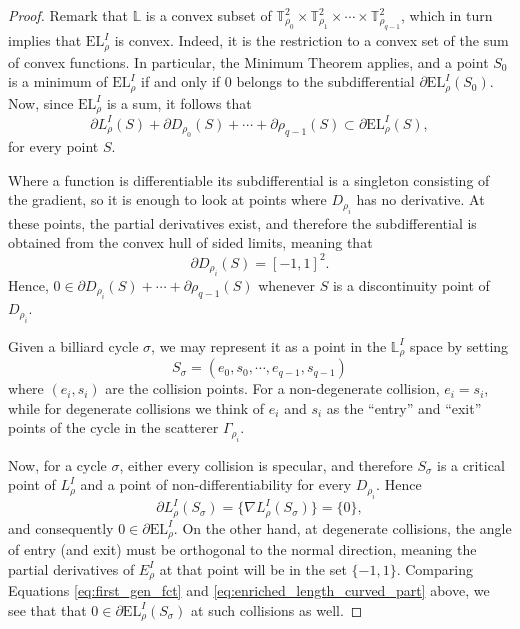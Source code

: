 \documentclass[reqno,11pt]{amsart}
\begin{document}
\begin{proof}
Remark that \( \mathbb{L} \) is a convex subset of \( \mathbb{T}_{\rho_0}^2 \times \mathbb{T}_{\rho_1}^2 \times \cdots \times \mathbb{T}_{\rho_{q-1}}^2 \), which in turn implies that \( \mathrm{EL}^I_\rho \) is convex. 
Indeed, it is the restriction to a convex set of the sum of convex functions.
In particular, the Minimum Theorem applies, and a point \( S_0 \) is a minimum of \( \mathrm{EL}^I_\rho \) if and only if \( 0 \) belongs to the subdifferential \( \partial\mathrm{EL}^I_\rho(S_0) \).
Now, since \( \mathrm{EL}^I_\rho \) is a sum, it follows that
\[
    \partial L^I_\rho(S) + \partial D_{\rho_0}(S) + \cdots + \partial {\rho_{q-1}}(S) \subset \partial\mathrm{EL}^I_\rho(S),
\]
for every point \( S \).
\par Where a function is differentiable its subdifferential is a singleton consisting of the gradient, so it is enough to look at points where \( D_{\rho_i} \) has no derivative.
At these points, the partial derivatives exist, and therefore the subdifferential is obtained from the convex hull of sided limits, meaning that
\[
    \partial D_{\rho_i} (S) = [-1, 1]^2.
\]
Hence, \( 0 \in \partial D_{\rho_i}(S) + \cdots + \partial {\rho_{q-1}}(S) \) whenever \( S \) is a discontinuity point of \( D_{\rho_i} \).
\par Given a billiard cycle \( \sigma \), we may represent it as a point in the \( \mathbb{L}^I_\rho \) space by setting
\[
    S_\sigma = (e_0, s_0, \cdots, e_{q-1}, s_{q-1})
\]
where \( (e_i, s_i) \) are the collision points. 
For a non-degenerate collision, \( e_i = s_i \), while for degenerate collisions we think of \(e_i\) and \(s_i\) as the ``entry'' and ``exit'' points of the cycle in the scatterer \( \Gamma_{\rho_i} \).
\par Now, for a cycle \(\sigma\), either every collision is specular, and therefore \( S_\sigma \) is a critical point of \( L^I_\rho \) and a point of non-differentiability for every \(D_{\rho_i}\). 
Hence
\[
    \partial L^I_\rho(S_\sigma) = \{\nabla L^I_\rho(S_\sigma)\} = \{0\},
\]
and consequently \( 0 \in \partial \mathrm{EL}^I_\rho. \)
On the other hand, at degenerate collisions, the angle of entry (and exit) must be orthogonal to the normal direction, meaning the partial derivatives of \( E^I_\rho \) at that point will be in the set \( \{-1, 1\} \).
Comparing Equations \eqref{eq:first_gen_fct} and \eqref{eq:enriched_length_curved_part} above, we see that that \( 0 \in \partial \mathrm{EL}^I_\rho(S_\sigma) \) at such collisions as well.
\end{proof}
\end{document}

